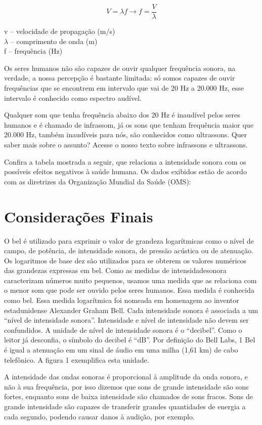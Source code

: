 \documentclass[
	article,		
	11pt,			
	oneside,		
	a4paper,			
	english,			
	brazil			
]{abntex2}
\begin{document}
\begin{equation}
    V = \lambda f \rightarrow f = \frac{V}{\lambda}
\end{equation}

\begin{center}
    v – velocidade de propagação (m/s)\\
    $\lambda$ – comprimento de onda (m)\\
    f – frequência (Hz)
\end{center}

Os seres humanos não são capazes de ouvir qualquer frequência sonora, na verdade, a nossa percepção é bastante limitada: só somos capazes de ouvir frequências que se encontrem em intervalo que vai de 20 Hz a 20.000 Hz, esse intervalo é conhecido como espectro audível.

Qualquer som que tenha frequência abaixo dos 20 Hz é inaudível pelos seres humanos e é chamado de infrassom, já os sons que tenham frequência maior que 20.000 Hz, também inaudíveis para nós, são conhecidos como ultrassons. Quer saber mais sobre o assunto? Acesse o nosso texto sobre infrassons e ultrassons.

Confira a tabela mostrada a seguir, que relaciona a intensidade sonora com os possíveis efeitos negativos à saúde humana. Os dados exibidos estão de acordo com as diretrizes da Organização Mundial da Saúde (OMS):



\section{Considerações Finais}

O bel é utilizado para exprimir o valor de grandeza logarítmicas como o nível de campo, de potência, de intensidade sonora, de pressão acústica ou de atenuação. Os logaritmos de base dez são utilizados para se obterem os valores numéricos das grandezas expressas em bel. Como as medidas de intensidadesonora caracterizam números muito pequenos, usamos uma medida que as relaciona com o menor som que pode ser ouvido pelos seres humanos. Essa medida é conhecida como bel. Essa medida logarítmica foi nomeada em homenagem ao inventor estadunidense Alexander Graham Bell.
Cada intensidade sonora é associada a um “nível de intensidade sonora”. Intensidade e nível de intensidade não devem ser confundidos. A unidade de nível de intensidade sonora é o “decibel”. Como o leitor já desconfia, o símbolo do decibel é “dB”. Por definição do Bell Labs, 1 Bel é igual a atenuação em um sinal de áudio em uma milha (1,61 km) de cabo telefônico. A figura 1 exemplifica esta unidade.

A intensidade das ondas sonoras é proporcional à amplitude da onda sonora, e não à sua frequência, por isso dizemos que sons de grande intensidade são sons fortes, enquanto sons de baixa intensidade são chamados de sons fracos. Sons de grande intensidade são capazes de transferir grandes quantidades de energia a cada segundo, podendo causar danos à audição, por exemplo.



\end{document}
